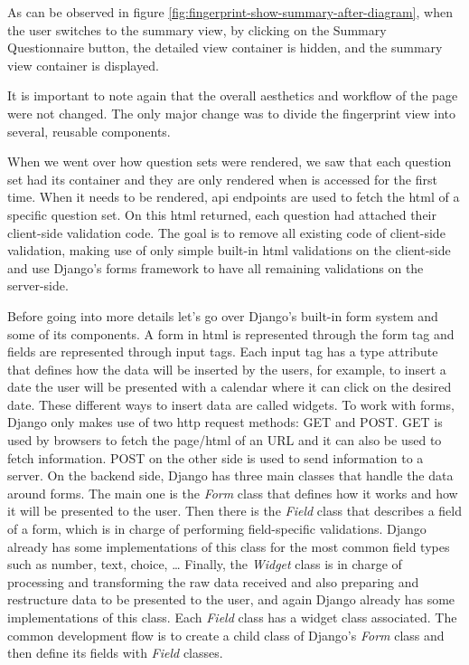 As can be observed in figure \ref{fig:fingerprint-show-summary-after-diagram}, when the user switches to the summary view, by clicking on the Summary Questionnaire button, the detailed view container is hidden, and the summary view container is displayed.

It is important to note again that the overall aesthetics and workflow of the page were not changed.
The only major change was to divide the fingerprint view into several, reusable components.

When we went over how question sets were rendered, we saw that each question set had its container and they are only rendered when is accessed for the first time.
When it needs to be rendered, \gls{api} endpoints are used to fetch the \gls{html} of a specific question set.
On this \gls{html} returned, each question had attached their client-side validation code.
The goal is to remove all existing code of client-side validation, making use of only simple built-in \gls{html} validations on the client-side and use Django's forms framework to have all remaining validations on the server-side.

Before going into more details let's go over Django's built-in form system and some of its components.
A form in \gls{html} is represented through the form tag and fields are represented through input tags.
Each input tag has a type attribute that defines how the data will be inserted by the users, for example, to insert a date the user will be presented with a calendar where it can click on the desired date.
These different ways to insert data are called widgets.
To work with forms, Django only makes use of two \gls{http} request methods: GET and POST.
GET is used by browsers to fetch the page/\gls{html} of an URL and it can also be used to fetch information.
POST on the other side is used to send information to a server.
On the backend side, Django has three main classes that handle the data around forms.
The main one is the \textit{Form} class that defines how it works and how it will be presented to the user.
Then there is the \textit{Field} class that describes a field of a form, which is in charge of performing field-specific validations.
Django already has some implementations of this class for the most common field types such as number, text, choice, \dots
Finally, the \textit{Widget} class is in charge of processing and transforming the raw data received and also preparing and restructure data to be presented to the user, and again Django already has some implementations of this class.
Each \textit{Field} class has a widget class associated.
The common development flow is to create a child class of Django's \textit{Form} class and then define its fields with \textit{Field} classes.

